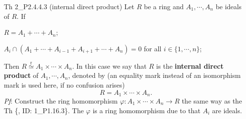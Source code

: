 \documentclass{article}
\newcommand{\Riso}{\overset{\text{r}}{\simeq}} %
\begin{document}
\begin{Th}{Th 2\_P2.4.4.3 (internal direct product)}
    Let $R$ be a ring and $A_1, \cdots, A_n$ be ideals of $R$. If
    \begin{compactenum}
        \item[(1)] $R = A_1 + \cdots + A_n$;
        \item[(2)] $A_i\cap (A_1 + \cdots + A_{i-1} + A_{i+1} + \cdots + A_n) = 0$ for all $i\in\{1, \cdots, n\}$;
    \end{compactenum}
    Then $R\Riso A_1\times\cdots\times A_n$. \textcolor{Df}{In this case we say that $R$ is the \textbf{internal direct product} of $A_1, \cdots, A_n$, denoted by (an equality mark instead of an isomorphism mark is used here, if no confusion arises)
    $$ R = A_1\times\cdots\times A_n. $$}
    \tcblower
    \textit{Pf}: Construct the ring homomorphism $\varphi: A_1\times\cdots\times A_n\to R$ the same way as the Th \{, ID: 1\_P1.16.3\}. The $\varphi$ is a ring homomorphism due to that $A_i$ are ideals.
\end{Th}
\end{document}
